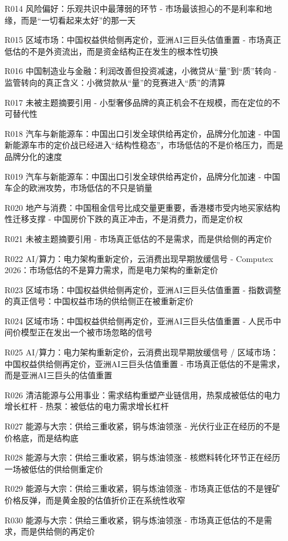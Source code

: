 \documentclass[11pt]{ctexart}
\begin{document}
\begin{itemize}
  \item [R014] 风险偏好：乐观共识中最薄弱的环节 - 市场最该担心的不是利率和地缘，而是“一切看起来太好”的那一天
  \item [R015] 区域市场：中国权益供给侧再定价，亚洲AI三巨头估值重置 - 市场真正低估的不是外资流出，而是资金结构正在发生的根本性切换
  \item [R016] 中国制造业与金融：利润改善但投资减速，小微贷从“量”到“质”转向 - 监管转向的真正含义：小微贷款从“量”的竞赛进入“质”的清算
  \item [R017] 未被主题摘要引用 - 小型奢侈品牌的真正机会不在规模，而在定位的不可替代性
  \item [R018] 汽车与新能源车：中国出口引发全球供给再定价，品牌分化加速 - 中国新能源车市的定价战已经进入“结构性稳态”，市场低估的不是价格压力，而是品牌分化的速度
  \item [R019] 汽车与新能源车：中国出口引发全球供给再定价，品牌分化加速 - 中国车企的欧洲攻势，市场低估的不只是销量
  \item [R020] 地产与消费：中国租金信号比成交量更重要，香港楼市受内地买家结构性迁移支撑 - 中国房价下跌的真正冲击，不是消费力，而是定价权
  \item [R021] 未被主题摘要引用 - 市场真正低估的不是需求，而是供给侧的再定价
  \item [R022] AI/算力：电力架构重新定价，云消费出现早期放缓信号 - Computex 2026：市场低估的不是算力需求，而是电力架构的重新定价
  \item [R023] 区域市场：中国权益供给侧再定价，亚洲AI三巨头估值重置 - 指数调整的真正信号：中国权益市场的供给侧正在被重新定价
  \item [R024] 区域市场：中国权益供给侧再定价，亚洲AI三巨头估值重置 - 人民币中间价模型正在发出一个被市场忽略的信号
  \item [R025] AI/算力：电力架构重新定价，云消费出现早期放缓信号 / 区域市场：中国权益供给侧再定价，亚洲AI三巨头估值重置 - 市场真正低估的不是需求，而是亚洲AI三巨头的估值重置
  \item [R026] 清洁能源与公用事业：需求结构重塑产业链信用，热泵成被低估的电力增长杠杆 - 热泵：被低估的电力需求增长杠杆
  \item [R027] 能源与大宗：供给三重收紧，铜与炼油领涨 - 光伏行业正在经历的不是价格底，而是结构底
  \item [R028] 能源与大宗：供给三重收紧，铜与炼油领涨 - 核燃料转化环节正在经历一场被低估的供给侧重定价
  \item [R029] 能源与大宗：供给三重收紧，铜与炼油领涨 - 市场真正低估的不是锂矿价格反弹，而是黄金股的估值折价正在系统性收窄
  \item [R030] 能源与大宗：供给三重收紧，铜与炼油领涨 - 市场真正低估的不是需求，而是供给侧的再定价

\end{itemize}
\end{document}
